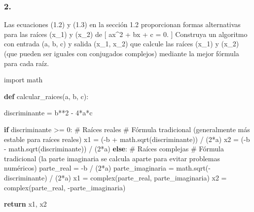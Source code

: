 \documentclass[
  letterpaper,
  DIV=11,
  numbers=noendperiod]{scrartcl}
\newenvironment{Shaded}{\begin{snugshade}}{\end{snugshade}}
\newcommand{\BuiltInTok}[1]{\textcolor[rgb]{0.00,0.23,0.31}{#1}}
\newcommand{\CommentTok}[1]{\textcolor[rgb]{0.37,0.37,0.37}{#1}}
\newcommand{\ControlFlowTok}[1]{\textcolor[rgb]{0.00,0.23,0.31}{\textbf{#1}}}
\newcommand{\DecValTok}[1]{\textcolor[rgb]{0.68,0.00,0.00}{#1}}
\newcommand{\ImportTok}[1]{\textcolor[rgb]{0.00,0.46,0.62}{#1}}
\newcommand{\KeywordTok}[1]{\textcolor[rgb]{0.00,0.23,0.31}{\textbf{#1}}}
\newcommand{\NormalTok}[1]{\textcolor[rgb]{0.00,0.23,0.31}{#1}}
\newcommand{\OperatorTok}[1]{\textcolor[rgb]{0.37,0.37,0.37}{#1}}
\begin{document}
\subsubsection{2.}\label{section}

Las ecuaciones (1.2) y (1.3) en la sección 1.2 proporcionan formas
alternativas para las raíces (x\_1) y (x\_2) de {[} ax\^{}2 + bx + c =
0. {]} Construya un algoritmo con entrada (a, b, c) y salida (x\_1,
x\_2) que calcule las raíces (x\_1) y (x\_2) (que pueden ser iguales con
conjugados complejos) mediante la mejor fórmula para cada raíz.

\begin{Shaded}
\begin{Highlighting}[]
\ImportTok{import}\NormalTok{ math}

\KeywordTok{def}\NormalTok{ calcular\_raices(a, b, c):}
    

\NormalTok{    discriminante }\OperatorTok{=}\NormalTok{ b}\OperatorTok{**}\DecValTok{2} \OperatorTok{{-}} \DecValTok{4}\OperatorTok{*}\NormalTok{a}\OperatorTok{*}\NormalTok{c}

    \ControlFlowTok{if}\NormalTok{ discriminante }\OperatorTok{\textgreater{}=} \DecValTok{0}\NormalTok{:  }\CommentTok{\# Raíces reales}
        \CommentTok{\# Fórmula tradicional (generalmente más estable para raíces reales)}
\NormalTok{        x1 }\OperatorTok{=}\NormalTok{ (}\OperatorTok{{-}}\NormalTok{b }\OperatorTok{+}\NormalTok{ math.sqrt(discriminante)) }\OperatorTok{/}\NormalTok{ (}\DecValTok{2}\OperatorTok{*}\NormalTok{a)}
\NormalTok{        x2 }\OperatorTok{=}\NormalTok{ (}\OperatorTok{{-}}\NormalTok{b }\OperatorTok{{-}}\NormalTok{ math.sqrt(discriminante)) }\OperatorTok{/}\NormalTok{ (}\DecValTok{2}\OperatorTok{*}\NormalTok{a)}
    \ControlFlowTok{else}\NormalTok{:  }\CommentTok{\# Raíces complejas}
        \CommentTok{\# Fórmula tradicional (la parte imaginaria se calcula aparte para evitar problemas numéricos)}
\NormalTok{        parte\_real }\OperatorTok{=} \OperatorTok{{-}}\NormalTok{b }\OperatorTok{/}\NormalTok{ (}\DecValTok{2}\OperatorTok{*}\NormalTok{a)}
\NormalTok{        parte\_imaginaria }\OperatorTok{=}\NormalTok{ math.sqrt(}\OperatorTok{{-}}\NormalTok{discriminante) }\OperatorTok{/}\NormalTok{ (}\DecValTok{2}\OperatorTok{*}\NormalTok{a)}
\NormalTok{        x1 }\OperatorTok{=} \BuiltInTok{complex}\NormalTok{(parte\_real, parte\_imaginaria)}
\NormalTok{        x2 }\OperatorTok{=} \BuiltInTok{complex}\NormalTok{(parte\_real, }\OperatorTok{{-}}\NormalTok{parte\_imaginaria)}

    \ControlFlowTok{return}\NormalTok{ x1, x2}


\end{Highlighting}
\end{Shaded}
\end{document}
